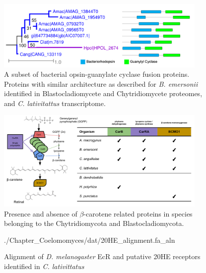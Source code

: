 \begin{figure}[hb]
  \centering
  \includegraphics[width=4in]{./Chapter_Coelomomyces/img/OpsinGCFusion_chytridCluster.png}
  \caption[Opsin-GC fusion proteins]{A subset of bacterial opsin-guanylate cyclase fusion proteins. Proteins with similar architecture as described for \textit{B. emersonii} identified in Blastocladiomycete and Chytridiomycete proteomes, and \textit{C. lativitattus} transcriptome.}
  \label{fig:ChClat_OpsinGC}
\end{figure}

\begin{figure}[hb]
  \centering
  \includegraphics[width=4in]{./Chapter_Coelomomyces/img/Figure_bcaroPresenceAbsence.png}
  \caption[$\beta$-carotene enzyme presence / absence]{Presence and absence of $\beta$-carotene related proteins in species belonging to the Chytridiomycota and Blastocladiomycota.}
  \label{fig:ChClat_Bcaro}
\end{figure}



\begin{figure}[hb]
  \centering
  \begin{texshade}{./Chapter_Coelomomyces/dat/20HE_alignment.fa_aln}
    \hideconsensus
  \end{texshade}
  \caption[20HE alignment]{Alignment of \textit{D. melanogaster} EcR and putative 20HE receptors identified in \textit{C. lativittatus} }
  \label{fig:ChClat_20HEalign}
\end{figure}
